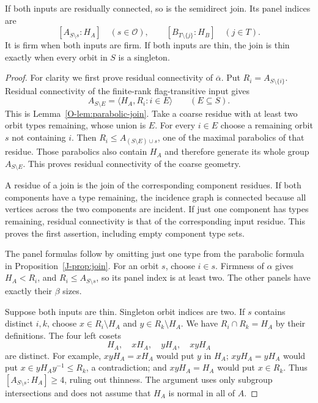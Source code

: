 \begin{proposition}\label{J-prop:residues}
If both inputs are residually connected, so is the semidirect join.
Its panel indices are
\[
 [A_{S\setminus s}:H_A]\quad(s\in\mathcal O),\qquad
 [B_{T\setminus\{j\}}:H_B]\quad(j\in T).
\]
It is firm when both inputs are firm. If both inputs are thin, the
join is thin exactly when every orbit in $S$ is a singleton.
\end{proposition}
\begin{proof}
For clarity we first prove residual connectivity of
$\overline\alpha$. Put $R_i=A_{S\setminus\{i\}}$.
Residual connectivity of the finite-rank flag-transitive input gives
\[
 A_{S\setminus E}=\langle H_A,R_i:i\in E\rangle
 \qquad(E\subseteq S).
\]
This is Lemma~\ref{O-lem:parabolic-join}. Take a coarse
residue with at least two orbit types remaining, whose union is $E$.
For every $i\in E$ choose a remaining orbit $s$ not containing $i$.
Then $R_i\leq A_{(S\setminus E)\cup s}$, one of the maximal
parabolics of that residue. Those parabolics also contain $H_A$ and
therefore generate its whole group $A_{S\setminus E}$. This proves
residual connectivity of the coarse geometry.

A residue of a join is the join of the corresponding component
residues. If both components have a type remaining, the incidence
graph is connected because all vertices across the two components
are incident. If just one component has types remaining, residual
connectivity is that of the corresponding input residue. This proves
the first assertion, including empty component type sets.

The panel formulas follow by omitting just one type from the
parabolic formula in Proposition~\ref{J-prop:join}. For an orbit $s$,
choose $i\in s$. Firmness of $\alpha$ gives $H_A<R_i$, and
$R_i\leq A_{S\setminus s}$, so its panel index is at least two.
The other panels have exactly their $\beta$ sizes.

Suppose both inputs are thin. Singleton orbit indices are two. If
$s$ contains distinct $i,k$, choose $x\in R_i\setminus H_A$ and
$y\in R_k\setminus H_A$. We have $R_i\cap R_k=H_A$ by their
definitions. The four left cosets
\[
 H_A,\quad xH_A,\quad yH_A,\quad xyH_A
\]
are distinct. For example, $xyH_A=xH_A$ would put $y$ in $H_A$;
$xyH_A=yH_A$ would put $x\in yH_Ay^{-1}\leq R_k$, a
contradiction; and $xyH_A=H_A$ would put $x\in R_k$.
Thus $[A_{S\setminus s}:H_A]\geq4$, ruling out thinness.
The argument uses only subgroup intersections and does not assume
that $H_A$ is normal in all of $A$.
\end{proof}


